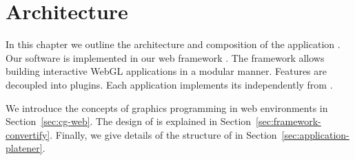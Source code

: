 \documentclass[../ClassicThesis.tex]{subfiles}
\begin{document}
\chapter{Architecture}
\label{ch:architecture}

In this chapter we outline the architecture and composition of the
application {\platener}. Our software is implemented in our web
framework {\convertify}. The framework allows building interactive
WebGL applications in a modular manner. Features are decoupled into
plugins. Each application implements its {\userinterface}
independently from {\convertify}.

We introduce the concepts of graphics programming in web
environments in Section~\ref{sec:cg-web}. The design of {\convertify}
is explained in Section~\ref{sec:framework-convertify}. Finally, we
give details of the structure of {\platener} in
Section~\ref{sec:application-platener}.








\end{document}
